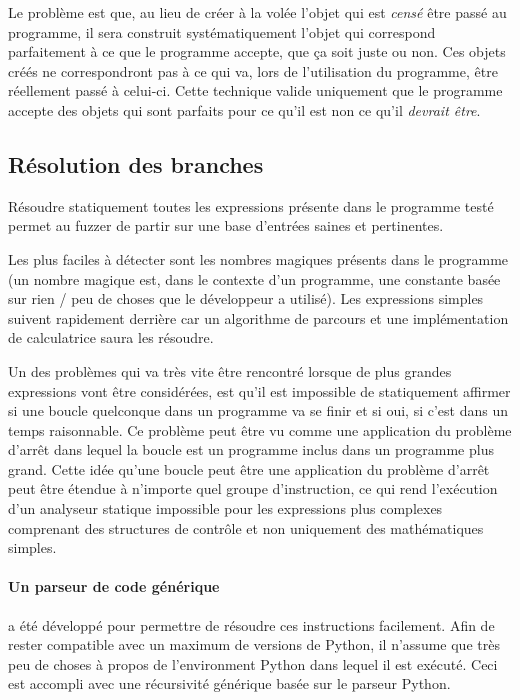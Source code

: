 \documentclass[a4paper]{report}
\begin{document}
Le problème est que, au lieu de créer à la volée l'objet qui est \textit{censé} être passé au programme, il sera construit systématiquement l'objet qui correspond parfaitement à ce que le programme accepte, que ça soit juste ou non.
Ces objets créés ne correspondront pas à ce qui va, lors de l'utilisation du programme, être réellement passé à celui-ci.
Cette technique valide uniquement que le programme accepte des objets qui sont parfaits pour ce qu'il est non ce qu'il \textit{devrait être}.



\subsection{Résolution des branches}

Résoudre statiquement toutes les expressions présente dans le programme testé permet au fuzzer de partir sur une base d'entrées saines et pertinentes.

Les plus faciles à détecter sont les nombres magiques présents dans le programme (un nombre magique est, dans le contexte d'un programme, une constante basée sur rien / peu de choses que le développeur a utilisé).
Les expressions simples suivent rapidement derrière car un algorithme de parcours et une implémentation de calculatrice saura les résoudre.

Un des problèmes qui va très vite être rencontré lorsque de plus grandes expressions vont être considérées, est qu'il est impossible de statiquement affirmer si une boucle quelconque dans un programme va se finir et si oui, si c'est dans un temps raisonnable.
Ce problème peut être vu comme une application du problème d'arrêt \cite{burkholder1987halting} dans lequel la boucle est un programme inclus dans un programme plus grand.
Cette idée qu'une boucle peut être une application du problème d'arrêt peut être étendue à n'importe quel groupe d'instruction, ce qui rend l'exécution d'un analyseur statique impossible pour les expressions plus complexes comprenant des structures de contrôle et non uniquement des mathématiques simples.

\paragraph{Un parseur de code générique} a été développé pour permettre de résoudre ces instructions facilement.
Afin de rester compatible avec un maximum de versions de Python, il n'assume que très peu de choses à propos de l'environment Python dans lequel il est exécuté.
Ceci est accompli avec une récursivité générique basée sur le parseur Python.
\end{document}
